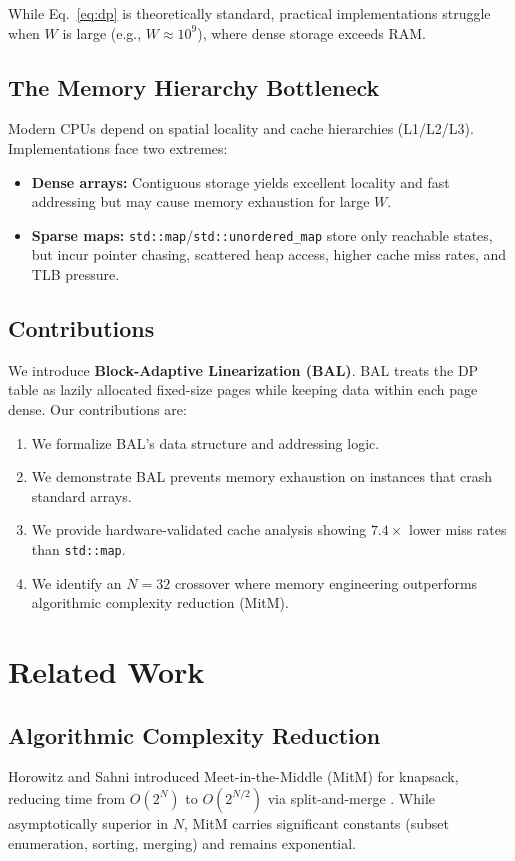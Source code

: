\documentclass[a4paper,USenglish]{lipics-v2021}
\begin{document}
While Eq.~\ref{eq:dp} is theoretically standard, practical implementations struggle when $W$ is large (e.g., $W\approx 10^9$), where dense storage exceeds RAM.

\subsection{The Memory Hierarchy Bottleneck}
Modern CPUs depend on spatial locality and cache hierarchies (L1/L2/L3). Implementations face two extremes:
\begin{itemize}
  \item \textbf{Dense arrays:} Contiguous storage yields excellent locality and fast addressing but may cause memory exhaustion for large $W$.
  \item \textbf{Sparse maps:} \texttt{std::map}/\texttt{std::unordered\_map} store only reachable states, but incur pointer chasing, scattered heap access, higher cache miss rates, and TLB pressure.
\end{itemize}

\subsection{Contributions}
We introduce \textbf{Block-Adaptive Linearization (BAL)}. BAL treats the DP table as lazily allocated fixed-size pages while keeping data within each page dense.
Our contributions are:
\begin{enumerate}
  \item We formalize BAL's data structure and addressing logic.
  \item We demonstrate BAL prevents memory exhaustion on instances that crash standard arrays.
  \item We provide hardware-validated cache analysis showing $7.4\times$ lower miss rates than \texttt{std::map}.
  \item We identify an $N=32$ crossover where memory engineering outperforms algorithmic complexity reduction (MitM).
\end{enumerate}

\section{Related Work}
\subsection{Algorithmic Complexity Reduction}
Horowitz and Sahni introduced Meet-in-the-Middle (MitM) for knapsack, reducing time from $O(2^N)$ to $O(2^{N/2})$ via split-and-merge \cite{horowitz1974}. While asymptotically superior in $N$, MitM carries significant constants (subset enumeration, sorting, merging) and remains exponential.
\end{document}
